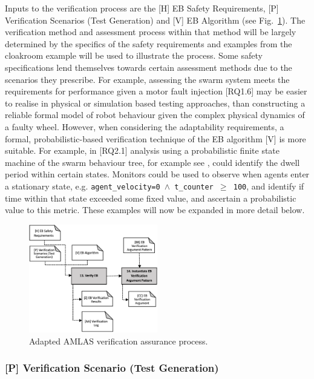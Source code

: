 \documentclass[lettersize,journal]{IEEEtran}
\begin{document}
Inputs to the verification process are the [H] EB Safety Requirements, [P] Verification Scenarios (Test Generation) and [V] EB Algorithm (see Fig.~\ref{amlas-a-stage5}). 
%
The verification method and assessment process within that method will be largely determined by the specifics of the safety requirements and examples from the cloakroom example will be used to illustrate the process. Some safety specifications lend themselves towards certain assessment methods due to the scenarios they prescribe.
%
For example, assessing the swarm system meets the requirements for performance given a motor fault injection [RQ1.6] may be easier to realise in physical or simulation based testing approaches, than constructing a reliable formal model of robot behaviour given the complex physical dynamics of a faulty wheel. 
%
However, when considering the adaptability requirements, a formal, probabilistic-based verification technique of the EB algorithm [V] is more suitable. For example, in [RQ2.1] analysis using a probabilistic finite state machine of the swarm behaviour tree, for example see \cite{Hoffmann2016,Calinescu2018}, could identify the dwell period within certain states. Monitors could be used to observe when agents enter a stationary state, e.g. \texttt{agent\_velocity=0 $\land $  t\_counter  $\ge$ 100}, and identify if time within that state exceeded some fixed value, and ascertain a probabilistic value to this metric.
%
These examples will now be expanded in more detail below.
\begin{figure}
	\centering
	\includegraphics[width=0.5\textwidth]{figures/amlas-a-stage5_v2.png}%
	\caption{Adapted AMLAS verification assurance process.}
	\label{amlas-a-stage5}
\end{figure}


\subsubsection*{[P] Verification Scenario (Test Generation)}
\end{document}
